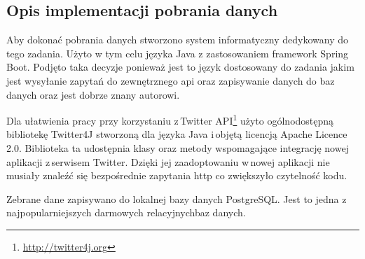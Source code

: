 \subsection{Opis implementacji pobrania danych}
Aby dokonać pobrania danych stworzono system informatyczny dedykowany do tego zadania. Użyto w tym celu języka Java z zastosowaniem framework Spring Boot. Podjęto taka decyzje ponieważ jest to język dostosowany do zadania jakim jest wysyłanie zapytań do zewnętrznego api oraz zapisywanie danych do baz danych oraz jest dobrze znany autorowi.  
\par
Dla ułatwienia pracy przy korzystaniu z\,Twitter API\footnote{\url{http://twitter4j.org}} użyto ogólnodostępną bibliotekę Twitter4J  stworzoną dla języka Java i\,objętą licencją Apache Licence 2.0. Biblioteka ta udostępnia klasy oraz metody wspomagające integrację nowej aplikacji z\,serwisem Twitter. Dzięki jej zaadoptowaniu w\,nowej aplikacji nie musiały znaleźć się bezpośrednie zapytania http co zwiększyło czytelność kodu.
\par
Zebrane dane zapisywano do lokalnej bazy danych PostgreSQL. Jest to jedna z najpopularniejszych darmowych relacyjnychbaz danych. 